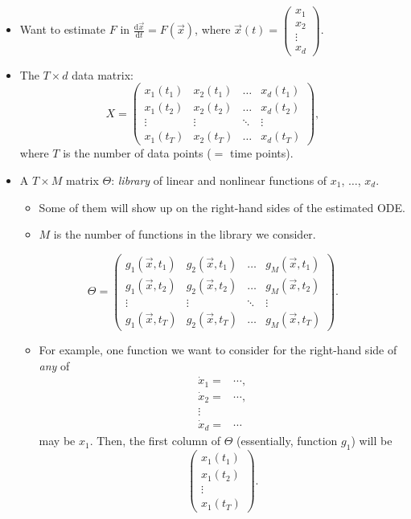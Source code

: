 \documentclass[20pt]{extarticle}
\begin{document}
\begin{itemize}
\item Want to estimate $F$ in
$\displaystyle \frac{\text{d}\vec{x}}{\text{d}t} = F(\vec{x})$,
where $\vec{x}(t) = \begin{pmatrix} x_1 \\ x_2 \\ \vdots \\ x_d \end{pmatrix}$.
%
\item The $T \times d$ data matrix:
\[ X = \begin{pmatrix} x_1(t_1) & x_2(t_1) & \ldots & x_d(t_1) \\
x_1(t_2) & x_2(t_2) & \ldots & x_d(t_2) \\
\vdots & \vdots & \ddots & \vdots \\
x_1(t_T) & x_2(t_T) & \ldots & x_d(t_T)
\end{pmatrix}, \]
where $T$ is the number of data points ($=$ time points).
%
\item A $T\times M$ matrix $\Theta$: \emph{library} of linear and nonlinear functions of $x_1$, $\ldots$, $x_d$.
	\begin{itemize}
	\item Some of them will show up on the right-hand sides of the estimated ODE.
	\item $M$ is the number of functions in the library we consider.
	\end{itemize}
\[ \Theta = \begin{pmatrix} g_1(\vec{x}, t_1) & g_2(\vec{x}, t_1) & \ldots & g_M(\vec{x}, t_1) \\
g_1(\vec{x}, t_2) & g_2(\vec{x}, t_2) & \ldots & g_M(\vec{x}, t_2) \\
\vdots & \vdots & \ddots & \vdots \\
g_1(\vec{x}, t_T) & g_2(\vec{x}, t_T) & \ldots & g_M(\vec{x}, t_T)
\end{pmatrix}. \]
	\begin{itemize}
	\item For example, one function we want to consider for the right-hand side of \emph{any} of
\[
\begin{aligned}
\dot{x}_1 =& \cdots,\\
\dot{x}_2 =& \cdots,\\
\vdots &\\
\dot{x}_d =& \cdots
\end{aligned}
\]
may be $x_1$. Then, the first column of $\Theta$ (essentially, function $g_1$) will be
\[ \begin{pmatrix} x_1(t_1) \\ x_1(t_2) \\ \vdots \\ x_1(t_T) \end{pmatrix}. \]

\end{itemize}
\end{itemize}
\end{document}
